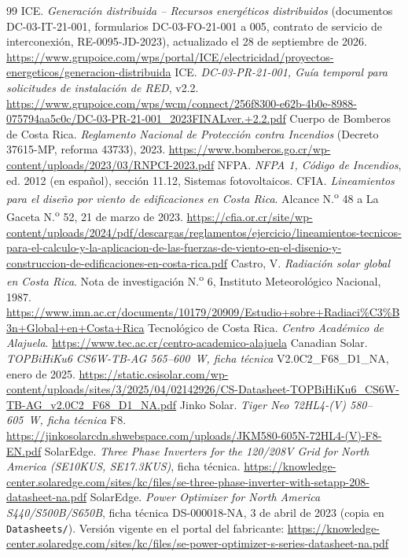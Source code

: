 \documentclass[12pt]{article}
\begin{document}
\begin{thebibliography}{99}
 ICE. \emph{Generación distribuida -- Recursos energéticos distribuidos} (documentos DC-03-IT-21-001, formularios DC-03-FO-21-001 a 005, contrato de servicio de interconexión, RE-0095-JD-2023), actualizado el 28 de septiembre de 2026. \url{https://www.grupoice.com/wps/portal/ICE/electricidad/proyectos-energeticos/generacion-distribuida}
 ICE. \emph{DC-03-PR-21-001, Guía temporal para solicitudes de instalación de RED}, v2.2. \url{https://www.grupoice.com/wps/wcm/connect/256f8300-e62b-4b0e-8988-075794aa5c0c/DC-03-PR-21-001_2023FINALver.+2.2.pdf}
 Cuerpo de Bomberos de Costa Rica. \emph{Reglamento Nacional de Protección contra Incendios} (Decreto 37615-MP, reforma 43733), 2023. \url{https://www.bomberos.go.cr/wp-content/uploads/2023/03/RNPCI-2023.pdf}
 NFPA. \emph{NFPA 1, Código de Incendios}, ed. 2012 (en español), sección 11.12, Sistemas fotovoltaicos.
 CFIA. \emph{Lineamientos para el diseño por viento de edificaciones en Costa Rica}. Alcance N.\textsuperscript{o} 48 a La Gaceta N.\textsuperscript{o} 52, 21 de marzo de 2023. \url{https://cfia.or.cr/site/wp-content/uploads/2024/pdf/descargas/reglamentos/ejercicio/lineamientos-tecnicos-para-el-calculo-y-la-aplicacion-de-las-fuerzas-de-viento-en-el-disenio-y-construccion-de-edificaciones-en-costa-rica.pdf}
 Castro, V. \emph{Radiación solar global en Costa Rica}. Nota de investigación N.\textsuperscript{o} 6, Instituto Meteorológico Nacional, 1987. \url{https://www.imn.ac.cr/documents/10179/20909/Estudio+sobre+Radiaci\%C3\%B3n+Global+en+Costa+Rica}
 Tecnológico de Costa Rica. \emph{Centro Académico de Alajuela}. \url{https://www.tec.ac.cr/centro-academico-alajuela}
 Canadian Solar. \emph{TOPBiHiKu6 CS6W-TB-AG 565--600~W, ficha técnica} V2.0C2\_F68\_D1\_NA, enero de 2025. \url{https://static.csisolar.com/wp-content/uploads/sites/3/2025/04/02142926/CS-Datasheet-TOPBiHiKu6_CS6W-TB-AG_v2.0C2_F68_D1_NA.pdf}
 Jinko Solar. \emph{Tiger Neo 72HL4-(V) 580--605~W, ficha técnica} F8. \url{https://jinkosolarcdn.shwebspace.com/uploads/JKM580-605N-72HL4-(V)-F8-EN.pdf}
 SolarEdge. \emph{Three Phase Inverters for the 120/208V Grid for North America (SE10KUS, SE17.3KUS)}, ficha técnica. \url{https://knowledge-center.solaredge.com/sites/kc/files/se-three-phase-inverter-with-setapp-208-datasheet-na.pdf}
 SolarEdge. \emph{Power Optimizer for North America S440/S500B/S650B}, ficha técnica DS-000018-NA, 3 de abril de 2023 (copia en \texttt{Datasheets/}). Versión vigente en el portal del fabricante: \url{https://knowledge-center.solaredge.com/sites/kc/files/se-power-optimizer-s-series-datasheet-na.pdf}

\end{thebibliography}
\end{document}
